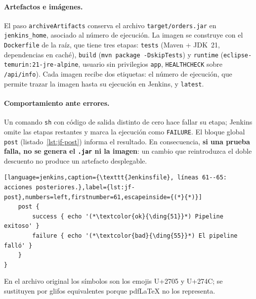 \documentclass[11pt,a4paper]{article}
\begin{document}
\paragraph{Artefactos e imágenes.} El paso \texttt{archiveArtifacts} conserva el archivo
\texttt{target/orders.jar} en \texttt{jenkins\_home}, asociado al número de ejecución. La imagen se construye con el
\texttt{Dockerfile} de la raíz, que tiene tres etapas: \texttt{tests} (Maven + JDK~21, dependencias
en caché), \texttt{build} (\texttt{mvn package -DskipTests}) y \texttt{runtime}
(\texttt{eclipse-temurin:21-jre-alpine}, usuario sin privilegios \texttt{app}, \texttt{HEALTHCHECK}
sobre \texttt{/api/info}). Cada imagen recibe dos etiquetas: el número de ejecución, que permite
trazar la imagen hasta su ejecución en Jenkins, y \texttt{latest}.

\paragraph{Comportamiento ante errores.} Un comando \texttt{sh} con código de salida distinto de cero
hace fallar su etapa; Jenkins omite las etapas restantes y marca la ejecución como
\texttt{FAILURE}. El bloque global \texttt{post} (listado~\ref{lst:jf-post}) informa el resultado.
En consecuencia, \textbf{si una prueba falla, no se genera el \texttt{.jar} ni la imagen}: un cambio
que reintroduzca el doble descuento no produce un artefacto desplegable.

\begin{lstlisting}[language=jenkins,caption={\texttt{Jenkinsfile}, líneas 61--65: acciones posteriores.},label={lst:jf-post},numbers=left,firstnumber=61,escapeinside={(*}{*)}]
    post {
        success { echo '(*\textcolor{ok}{\ding{51}}*) Pipeline exitoso' }
        failure { echo '(*\textcolor{bad}{\ding{55}}*) El pipeline falló' }
    }
}
\end{lstlisting}
{\small En el archivo original los símbolos son los emojis U+2705 y U+274C; se sustituyen por
glifos equivalentes porque pdf\LaTeX{} no los representa.}
\end{document}
